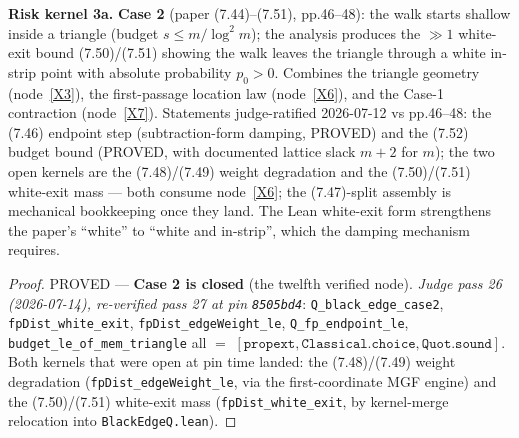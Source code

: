 \begin{lemma}\label{X8}
  \leanok
\textbf{Risk kernel 3a.}  \textbf{Case 2} (paper (7.44)--(7.51), pp.46--48): the walk starts
shallow inside a triangle (budget \(s\le m/\log^2 m\)); the analysis produces the \(\gg 1\)
white-exit bound (7.50)/(7.51) showing the walk leaves the triangle through a white in-strip
point with absolute probability \(p_0>0\).  Combines the triangle geometry (node~\ref{X3}),
the first-passage location law (node~\ref{X6}), and the Case-1 contraction (node~\ref{X7}).
Statements judge-ratified 2026-07-12 vs pp.46--48: the (7.46) endpoint step
(subtraction-form damping, PROVED) and the (7.52) budget bound (PROVED, with documented
lattice slack \(m+2\) for \(m\)); the two open kernels are the (7.48)/(7.49) weight
degradation and the (7.50)/(7.51) white-exit mass --- both consume node~\ref{X6}; the
(7.47)-split assembly is mechanical bookkeeping once they land.  The Lean white-exit form
strengthens the paper's ``white'' to ``white and in-strip'', which the damping mechanism
requires.
\end{lemma}

\begin{proof}
  \leanok
  PROVED --- \textbf{Case 2 is closed} (the twelfth verified node).  \emph{Judge pass 26
  (2026-07-14), re-verified pass 27 at pin \texttt{8505bd4}}: \texttt{Q\_black\_edge\_case2},
  \texttt{fpDist\_white\_exit}, \texttt{fpDist\_edgeWeight\_le},
  \texttt{Q\_fp\_endpoint\_le}, \texttt{budget\_le\_of\_mem\_triangle} all \(=\)
  \([\texttt{propext}, \texttt{Classical.choice}, \texttt{Quot.sound}]\).  Both kernels that
  were open at pin time landed: the (7.48)/(7.49) weight degradation
  (\texttt{fpDist\_edgeWeight\_le}, via the first-coordinate MGF engine) and the
  (7.50)/(7.51) white-exit mass (\texttt{fpDist\_white\_exit}, by kernel-merge relocation into
  \texttt{BlackEdgeQ.lean}).
\end{proof}

